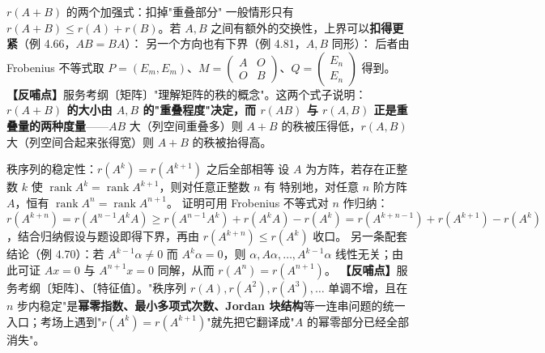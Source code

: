 \begin{fdeep}{$r(A+B)$ 的两个加强式：扣掉"重叠部分"}
一般情形只有 $r(A+B)\le r(A)+r(B)$。若 $A,B$ 之间有额外的交换性，上界可以\textbf{扣得更紧}（例 4.66，$AB=BA$）：
另一个方向也有下界（例 4.81，$A,B$ 同形）：
后者由 Frobenius 不等式取 $P=(E_m,E_m)$、$M=\begin{pmatrix}A&O\\ O&B\end{pmatrix}$、$Q=\begin{pmatrix}E_n\\ E_n\end{pmatrix}$ 得到。
\textbf{【反哺点】}服务考纲〔矩阵〕"理解矩阵的秩的概念"。这两个式子说明：\textbf{$r(A+B)$ 的大小由 $A,B$ 的"重叠程度"决定，而 $r(AB)$ 与 $r(A,B)$ 正是重叠量的两种度量}——$AB$ 大（列空间重叠多）则 $A+B$ 的秩被压得低，$r(A,B)$ 大（列空间合起来张得宽）则 $A+B$ 的秩被抬得高。
\end{fdeep}


\begin{fdeep}{秩序列的稳定性：$r(A^{k})=r(A^{k+1})$ 之后全部相等}
设 $A$ 为方阵，若存在正整数 $k$ 使
$\operatorname{rank}A^{k}=\operatorname{rank}A^{k+1}$，则对任意正整数 $n$ 有
特别地，对任意 $n$ 阶方阵 $A$，恒有 $\operatorname{rank}A^{n}=\operatorname{rank}A^{n+1}$。
证明可用 Frobenius 不等式对 $n$ 作归纳：$r(A^{k+n})=r(A^{n-1}A^{k}A)\ge r(A^{n-1}A^{k})+r(A^{k}A)-r(A^{k})=r(A^{k+n-1})+r(A^{k+1})-r(A^{k})$，结合归纳假设与题设即得下界，再由 $r(A^{k+n})\le r(A^{k})$ 收口。
另一条配套结论（例 4.70）：若 $A^{k-1}\alpha\ne0$ 而 $A^{k}\alpha=0$，则 $\alpha,A\alpha,\dots,A^{k-1}\alpha$ 线性无关；由此可证 $Ax=0$ 与 $A^{n+1}x=0$ 同解，从而 $r(A^{n})=r(A^{n+1})$。
\textbf{【反哺点】}服务考纲〔矩阵〕、〔特征值〕。"秩序列 $r(A),r(A^{2}),r(A^{3}),\dots$ 单调不增，且在 $n$ 步内稳定"是\textbf{幂零指数、最小多项式次数、Jordan 块结构}等一连串问题的统一入口；考场上遇到"$r(A^{k})=r(A^{k+1})$"就先把它翻译成"$A$ 的幂零部分已经全部消失"。
\end{fdeep}


